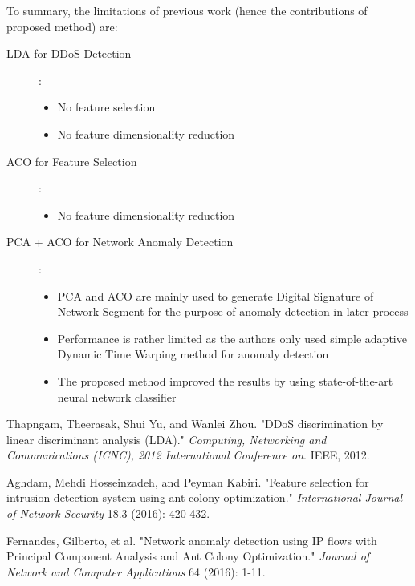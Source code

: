 \documentclass[a4paper]{article}
\begin{document}
To summary, the limitations of previous work (hence the contributions of proposed method) are:
\begin{description}
	\item [LDA for DDoS Detection \cite{thapngam2012ddos}]:
		\begin{itemize}
			\item No feature selection
			\item No feature dimensionality reduction
		\end{itemize}	 
	\item [ACO for Feature Selection \cite{aghdam2016feature}]:
		\begin{itemize}
			\item No feature dimensionality reduction
		\end{itemize}
	
	\item[PCA + ACO for Network Anomaly Detection \cite{fernandes2016network}]:
		\begin{itemize}
			\item PCA and ACO are mainly used to generate Digital Signature of Network Segment for the purpose of anomaly detection in later process
			\item Performance is rather limited as the authors only used simple adaptive Dynamic Time Warping method for anomaly detection
			\item The proposed method improved the results by using state-of-the-art neural network classifier
		\end{itemize}
\end{description}




\begin{thebibliography}{99}

 Thapngam, Theerasak, Shui Yu, and Wanlei Zhou. "DDoS discrimination by linear discriminant analysis (LDA)." \textit{Computing, Networking and Communications (ICNC), 2012 International Conference on}. IEEE, 2012.

 Aghdam, Mehdi Hosseinzadeh, and Peyman Kabiri. "Feature selection for intrusion detection system using ant colony optimization." \textit{International Journal of Network Security} 18.3 (2016): 420-432.

 Fernandes, Gilberto, et al. "Network anomaly detection using IP flows with Principal Component Analysis and Ant Colony Optimization." \textit{Journal of Network and Computer Applications} 64 (2016): 1-11.

\end{thebibliography}
\end{document}
